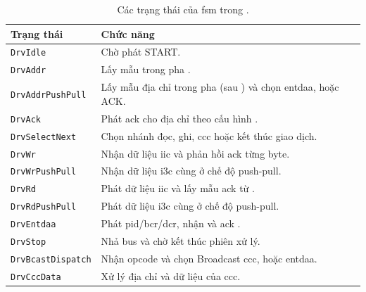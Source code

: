 \begin{table}[!htbp]
	\centering
	\caption{Các trạng thái của \gls{fsm} trong \IThreeCDriver{}.}
	\label{tab:drv-phase}
	\begin{tabular}{L{4.0cm} L{9.2cm}}
		\toprule
		\textbf{Trạng thái}       & \textbf{Chức năng}                                                                                        \\
		\midrule
		\texttt{DrvIdle}          & Chờ \Host{} phát START.                                                                                   \\
		\texttt{DrvAddr}          & Lấy mẫu \AddressHeader{} trong pha \OpenDrain{}.                                                          \\
		\texttt{DrvAddrPushPull}  & Lấy mẫu địa chỉ trong pha \PushPull{} (sau \RepeatedSTART{}) và chọn \gls{entdaa}, \DirectCCC{} hoặc ACK. \\
		\texttt{DrvAck}           & Phát \gls{ack} cho địa chỉ theo cấu hình \Target{}.                                                       \\
		\texttt{DrvSelectNext}    & Chọn nhánh đọc, ghi, \gls{ccc} hoặc kết thúc giao dịch.                                                   \\
		\texttt{DrvWr}            & Nhận dữ liệu \gls{iic} và phản hồi \gls{ack} từng byte.                                                   \\
		\texttt{DrvWrPushPull}    & Nhận dữ liệu \gls{i3c} cùng \TBit{} ở chế độ push-pull.                                                   \\
		\texttt{DrvRd}            & Phát dữ liệu \gls{iic} và lấy mẫu \gls{ack} từ \Host{}.                                                   \\
		\texttt{DrvRdPushPull}    & Phát dữ liệu \gls{i3c} cùng \TBit{} ở chế độ push-pull.                                                   \\
		\texttt{DrvEntdaa}        & Phát \gls{pid}/\gls{bcr}/\gls{dcr}, nhận và \gls{ack} \DynamicAddress{}.                                  \\
		\texttt{DrvStop}          & Nhả bus và chờ kết thúc phiên xử lý.                                                                      \\
		\texttt{DrvBcastDispatch} & Nhận opcode và chọn Broadcast \gls{ccc}, \DirectCCC{} hoặc \gls{entdaa}.                                  \\
		\texttt{DrvCccData}       & Xử lý địa chỉ \Target{} và dữ liệu của \gls{ccc}.                                                         \\
		\bottomrule
	\end{tabular}
\end{table}

